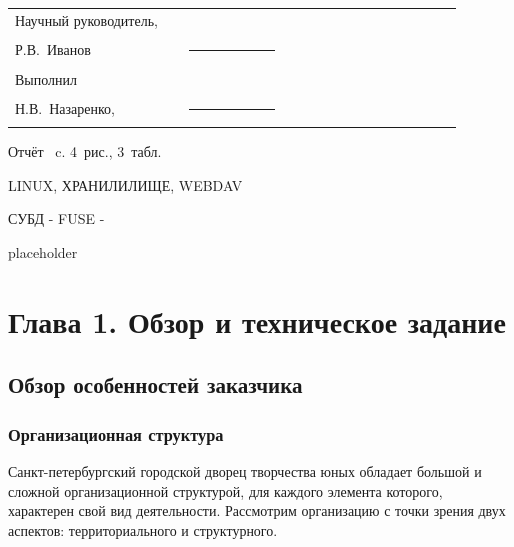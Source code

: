 \documentclass[utf8,usehyperref,12pt]{G7-32}
\begin{document}

\frontmatter %



\Executors %
\begin{longtable}{p{0.35\linewidth}p{0.2\linewidth}p{0.35\linewidth}}
Научный руководитель, 	&		&	\\
Р.В.~Иванов	&\rule{1\linewidth}{0.1pt}	&  \\ \vspace{1cm}

Выполнил  &		&	\\
Н.В.~Назаренко, & \rule{1\linewidth}{0.1pt}& \\
\end{longtable}

\Referat %
Отчёт \pageref{LastPage}~c. 4~рис., 3~табл.

\MakeUppercase{Linux, хранилилище, webdav}



\tableofcontents

\Defines %
СУБД -
FUSE -


\Introduction

placeholder

\mainmatter %

\chapter{Глава 1. Обзор и техническое задание}

\section{Обзор особенностей заказчика}
\subsection{Организационная структура}
Санкт-петербургский городской дворец творчества юных обладает большой и сложной организационной структурой, для каждого 
элемента которого, характерен свой вид деятельности. Рассмотрим организацию с точки зрения двух аспектов: территориального
и структурного.
\end{document}

